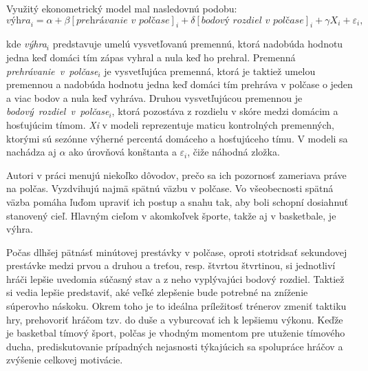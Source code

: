 \documentclass[
  digital, %
  twoside, %
  notable,   %
  lof,     %
  lot,     %
]{fithesis3}
\begin{document}
		Využitý ekonometrický model mal nasledovnú podobu:
		\begin{equation}
		\label{eq:bp}
		\textit{výhra}_{i} = \alpha + \beta [\textit{prehrávanie~v~polčase}]_{i} + \delta [\textit{bodový~rozdiel~v~polčase}]_{i} + \gamma X_{i} + \varepsilon_{i},
		\end{equation}
		
		kde \textit{výhra$_{i}$} predstavuje umelú vysvetľovanú premennú, ktorá nadobúda hodnotu jedna keď domáci tím zápas vyhral a nula keď ho prehral. Premenná \textit{prehrávanie~v~polčase$ _{i} $} je vysvetľujúca premenná, ktorá je taktiež umelou premennou a nadobúda hodnotu jedna keď domáci tím prehráva v polčase o jeden a viac bodov a nula keď vyhráva. Druhou vysvetľujúcou premennou je \textit{bodový~rozdiel~v~polčase$ _{i} $}, ktorá pozostáva z rozdielu v skóre medzi domácim a hosťujúcim tímom. \textit{Xi} v modeli reprezentuje maticu kontrolných premenných, ktorými sú sezónne výherné percentá domáceho a hosťujúceho tímu.  V modeli sa nachádza aj $\alpha$ ako úrovňová konštanta a $\varepsilon_{i}$, čiže náhodná zložka.
		
		Autori v práci menujú niekoľko dôvodov, prečo sa ich pozornosť zameriava práve na polčas. Vyzdvihujú najmä spätnú väzbu v polčase. Vo všeobecnosti spätná väzba pomáha ľuďom upraviť ich postup a snahu tak, aby boli schopní dosiahnuť stanovený cieľ. \parencite{locke2002} Hlavným cieľom v akomkoľvek športe, takže aj v basketbale, je výhra.
		
		Počas dlhšej pätnásť minútovej prestávky v polčase, oproti stotridsať sekundovej prestávke medzi prvou a druhou a treťou, resp. štvrtou štvrtinou, si jednotliví hráči lepšie uvedomia súčasný stav a z neho vyplývajúci bodový rozdiel. Taktiež si vedia lepšie predstaviť, aké veľké zlepšenie bude potrebné na zníženie súperovho náskoku. Okrem toho je to ideálna príležitosť trénerov zmeniť taktiku hry, prehovoriť hráčom tzv. do duše a vyburcovať ich k lepšiemu výkonu. Keďže je basketbal tímový šport, polčas je vhodným momentom pre utuženie tímového ducha, prediskutovanie prípadných nejasnosti týkajúcich sa spolupráce hráčov a zvýšenie celkovej motivácie.
		
\end{document}
